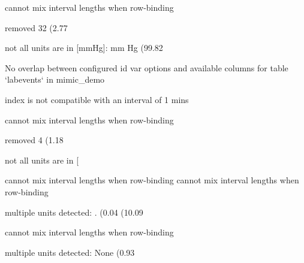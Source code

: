 \documentclass[
]{jss}
\begin{document}
\begin{CodeChunk}
\begin{CodeOutput}
cannot mix interval lengths when row-binding
\end{CodeOutput}

\begin{CodeOutput}
removed 32 (2.77%
\end{CodeOutput}

\begin{CodeOutput}
not all units are in [mmHg]: mm Hg (99.82%
\end{CodeOutput}

\begin{CodeOutput}
No overlap between configured id var options and available columns for table
`labevents` in mimic_demo
\end{CodeOutput}

\begin{CodeOutput}
index is not compatible with an interval of 1 mins
\end{CodeOutput}

\begin{CodeOutput}
cannot mix interval lengths when row-binding
\end{CodeOutput}

\begin{CodeOutput}
removed 4 (1.18%
\end{CodeOutput}

\begin{CodeOutput}
not all units are in [%
\end{CodeOutput}

\begin{CodeOutput}
cannot mix interval lengths when row-binding
cannot mix interval lengths when row-binding
\end{CodeOutput}

\begin{CodeOutput}
multiple units detected: . (0.04%
(10.09%
\end{CodeOutput}

\begin{CodeOutput}
cannot mix interval lengths when row-binding
\end{CodeOutput}

\begin{CodeOutput}
multiple units detected: None (0.93%
\end{CodeOutput}


\end{CodeChunk}
\end{document}
